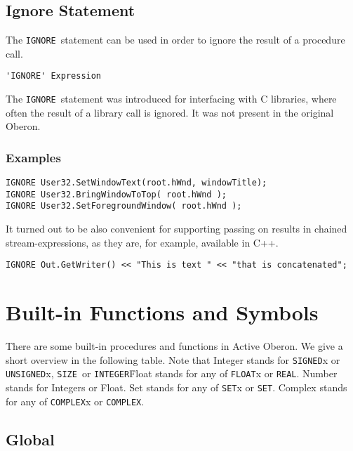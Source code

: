 \documentclass[a4wide,11pt]{article}
\newcommand{\IGNORE}{\lstinline"IGNORE"}
\newcommand{\INTEGER}{\lstinline"INTEGER"}
\newcommand{\SIGNED}{\lstinline"SIGNED"}
\newcommand{\UNSIGNED}{\lstinline"UNSIGNED"}
\newcommand{\REAL}{\lstinline"REAL"}
\newcommand{\COMPLEX}{\lstinline"COMPLEX"}
\newcommand{\FLOAT}{\lstinline"FLOAT"}
\newcommand{\SET}{\lstinline"SET"}
\newcommand{\SIZE}{\lstinline"SIZE"}
\begin{document}
\subsection{Ignore Statement}
The \IGNORE\ statement can be used in order to ignore the result of a procedure call.

\begin{lstlisting}[style=ebnf]
'IGNORE' Expression
\end{lstlisting}

\begin{annotation}
The \IGNORE\ statement was introduced for interfacing with C libraries, where often the result of a library call is ignored.
It was not present in the original Oberon.

\subsubsection{Examples}
\begin{lstlisting}[style=example]
IGNORE User32.SetWindowText(root.hWnd, windowTitle);
IGNORE User32.BringWindowToTop( root.hWnd );
IGNORE User32.SetForegroundWindow( root.hWnd );
\end{lstlisting}

It turned out to be also convenient for supporting passing on results in chained stream-expressions, as they are, for example, available in C++.
\begin{lstlisting}[style=example]
IGNORE Out.GetWriter() << "This is text " << "that is concatenated";
\end{lstlisting}

\end{annotation}

\section{Built-in Functions and Symbols}
There are some built-in procedures and functions in Active Oberon.
We give a short overview in the following table.
Note that Integer stands for \SIGNED{x} or \UNSIGNED{x}, \SIZE\ or \INTEGER\.
Float stands for any of \FLOAT{x} or \REAL.
Number stands for Integers or Float.
Set stands for any of \SET{x} or \SET.
Complex stands for any of \COMPLEX{x} or \COMPLEX.
\subsection{Global}
\end{document}
